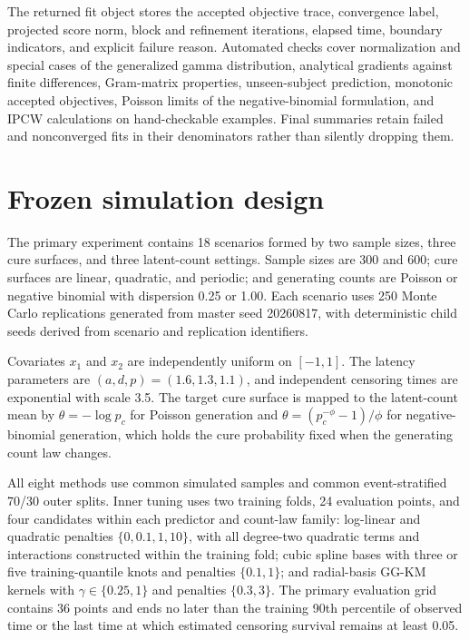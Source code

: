 \documentclass[11pt]{article}
\begin{document}
The returned fit object stores the accepted objective trace, convergence label, projected score norm, block and refinement iterations, elapsed time, boundary indicators, and explicit failure reason. Automated checks cover normalization and special cases of the generalized gamma distribution, analytical gradients against finite differences, Gram-matrix properties, unseen-subject prediction, monotonic accepted objectives, Poisson limits of the negative-binomial formulation, and IPCW calculations on hand-checkable examples. Final summaries retain failed and nonconverged fits in their denominators rather than silently dropping them.

\section{Frozen simulation design}\label{sec:supp-simulation}

The primary experiment contains 18 scenarios formed by two sample sizes, three cure surfaces, and three latent-count settings. Sample sizes are 300 and 600; cure surfaces are linear, quadratic, and periodic; and generating counts are Poisson or negative binomial with dispersion 0.25 or 1.00. Each scenario uses 250 Monte Carlo replications generated from master seed 20260817, with deterministic child seeds derived from scenario and replication identifiers.

Covariates $x_1$ and $x_2$ are independently uniform on $[-1,1]$. The latency parameters are $(a,d,p)=(1.6,1.3,1.1)$, and independent censoring times are exponential with scale 3.5. The target cure surface is mapped to the latent-count mean by $\theta=-\log p_c$ for Poisson generation and $\theta=(p_c^{-\phi}-1)/\phi$ for negative-binomial generation, which holds the cure probability fixed when the generating count law changes.

All eight methods use common simulated samples and common event-stratified 70/30 outer splits. Inner tuning uses two training folds, 24 evaluation points, and four candidates within each predictor and count-law family: log-linear and quadratic penalties $\{0,0.1,1,10\}$, with all degree-two quadratic terms and interactions constructed within the training fold; cubic spline bases with three or five training-quantile knots and penalties $\{0.1,1\}$; and radial-basis GG-KM kernels with $\gamma\in\{0.25,1\}$ and penalties $\{0.3,3\}$. The primary evaluation grid contains 36 points and ends no later than the training 90th percentile of observed time or the last time at which estimated censoring survival remains at least 0.05.
\end{document}
